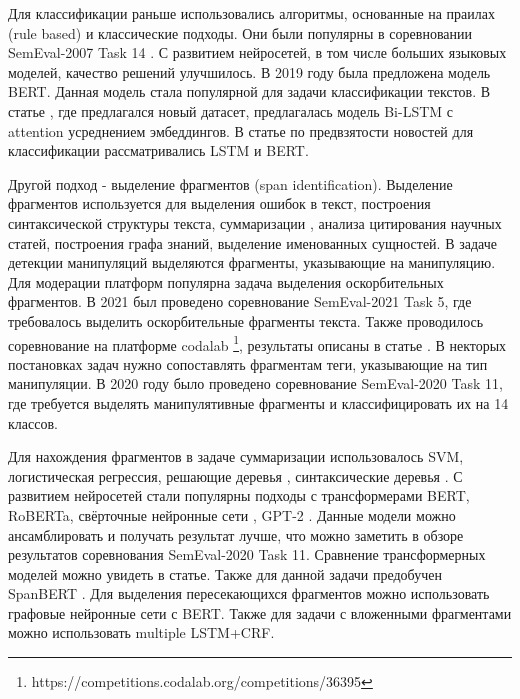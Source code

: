 \documentclass{article}
\begin{document}
Для классификации раньше использовались алгоритмы, основанные на праилах (rule based) и классические подходы. Они были популярны в соревновании SemEval-2007 Task 14 \cite{strapparava2007semeval}. С развитием нейросетей, в том числе больших языковых моделей, качество решений улучшилось. 
В 2019 году была предложена модель BERT\cite{devlin2019bert}. Данная модель стала популярной для задачи классификации текстов. В статье \cite{anoop22readers}, где предлагался новый датасет, предлагалась модель Bi-LSTM с attention усреднением эмбеддингов. В статье по предвзятости новостей \cite{bias} для классификации рассматривались LSTM и BERT.

Другой подход - выделение фрагментов (span identification)\cite{papay2020dissecting, toshniwal2020crosstask}. Выделение фрагментов используется для выделения ошибок в текст\cite{chen2020improving}, построения синтаксической структуры текста\cite{yeung2015automatic}, суммаризации \cite{Ma2018, la2019poli2sum, liu2021sent2span}, анализа цитирования научных статей\cite{la2019poli2sum}, построения графа знаний\cite{cheng2020ape}, выделение именованных сущностей\cite{li2019unified, rojas2022simple}. В задаче детекции манипуляций выделяются фрагменты, указывающие на манипуляцию. Для модерации платформ популярна задача выделения оскорбительных фрагментов. В 2021 был проведено соревнование SemEval-2021 Task 5\cite{pavlopoulos2021semeval}, где требовалось выделить оскорбительные фрагменты текста. Также проводилось соревнование на платформе codalab \footnote{https://competitions.codalab.org/competitions/36395}, результаты описаны в статье \cite{ravikiran2022findings}. В некторых постановках задач нужно сопоставлять фрагментам теги, указывающие на тип манипуляции. В 2020 году было проведено соревнование SemEval-2020 Task 11\cite{martino2020semeval}, где требуется выделять манипулятивные фрагменты и классифицировать их на 14 классов.

Для нахождения фрагментов в задаче суммаризации использовалось SVM, логистическая регрессия, решающие деревья \cite{Ma2018}, синтаксические деревья \cite{yeung2015automatic}. С развитием нейросетей стали популярны подходы с трансформерами BERT\cite{xu2023peerda}, RoBERTa\cite{ravikiran2022findings, jurkiewicz2020applicaai}, свёрточные нейронные сети \cite{dewantara-etal-2020-3218ir}, GPT-2 \cite{nouri2022data}. Данные модели можно ансамблировать и получать результат лучше, что можно заметить в обзоре результатов соревнования SemEval-2020 Task 11\cite{martino2020semeval}. Сравнение трансформерных моделей можно увидеть в статье\cite{toshniwal2020crosstask}. Также для данной задачи предобучен SpanBERT \cite{joshi2020spanbert}. Для выделения пересекающихся фрагментов можно использовать графовые нейронные сети с BERT\cite{zaratiana2022gnner}. Также для задачи с вложенными фрагментами можно использовать multiple LSTM+CRF\cite{rojas2022simple}.
\end{document}
